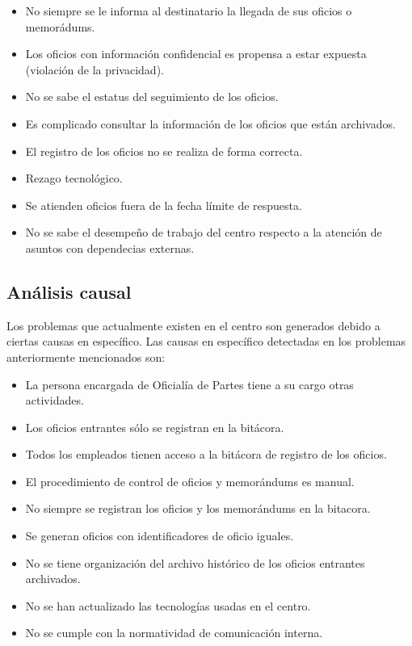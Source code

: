 \begin{itemize}
	
	\item No siempre se le informa al destinatario la llegada de sus oficios o memorádums.
	\item Los oficios con información confidencial es propensa a estar expuesta (violación de la privacidad).
	\item No se sabe el estatus del seguimiento de los oficios.
	\item Es complicado consultar la información de los oficios que están archivados.
	\item El registro de los oficios no se realiza de forma correcta.
	\item Rezago tecnológico.
	\item Se atienden oficios fuera de la fecha límite de respuesta.
	\item No se sabe el desempeño de trabajo del centro respecto a la atención de asuntos con dependecias externas.
	
\end{itemize}

\subsection{Análisis causal}

Los problemas que actualmente existen en el centro son generados debido a ciertas causas en específico. Las causas en específico detectadas en los problemas anteriormente mencionados son:

\begin{itemize}
	
	\item La persona encargada de Oficialía de Partes tiene a su cargo otras actividades.
	\item Los oficios entrantes sólo se registran en la bitácora.
	\item Todos los empleados tienen acceso a la bitácora de registro de los oficios.
	\item El procedimiento de control de oficios y memorándums es manual.
	\item No siempre se registran los oficios y los memorándums en la bitacora.
	\item Se generan oficios con identificadores de oficio iguales.
	\item No se tiene organización del archivo histórico de los oficios entrantes archivados.
	\item No se han actualizado las tecnologías usadas en el centro.
	\item No se cumple con la normatividad de comunicación interna.
	
\end{itemize}

